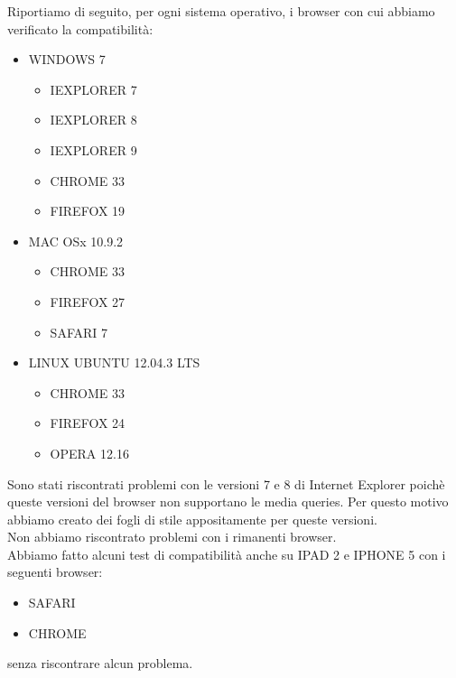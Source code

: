 Riportiamo di seguito, per ogni sistema operativo, i browser con cui abbiamo verificato la compatibilit\`a:
\begin{itemize}
		\item WINDOWS 7
		\begin{itemize}
			\item IEXPLORER 7
			\item IEXPLORER 8
			\item IEXPLORER 9
			\item CHROME 33
			\item FIREFOX 19
		\end{itemize}
		\item MAC OSx 10.9.2
		\begin{itemize}
			\item CHROME 33
			\item FIREFOX 27
			\item SAFARI 7
		\end{itemize}
		\item LINUX UBUNTU 12.04.3 LTS
		\begin{itemize}
			\item CHROME 33
			\item FIREFOX 24
			\item OPERA 12.16
		\end{itemize}
\end{itemize}

Sono stati riscontrati problemi con le versioni 7 e 8 di Internet Explorer poich\`e queste versioni del browser non supportano le media queries. Per questo motivo abbiamo creato dei fogli di stile appositamente per queste versioni.
\\Non abbiamo riscontrato problemi con i rimanenti browser.
\\Abbiamo fatto alcuni test di compatibilit\`a anche su IPAD 2 e IPHONE 5 con i seguenti browser:
\begin{itemize}
	\item SAFARI
	\item CHROME
\end{itemize}
senza riscontrare alcun problema.